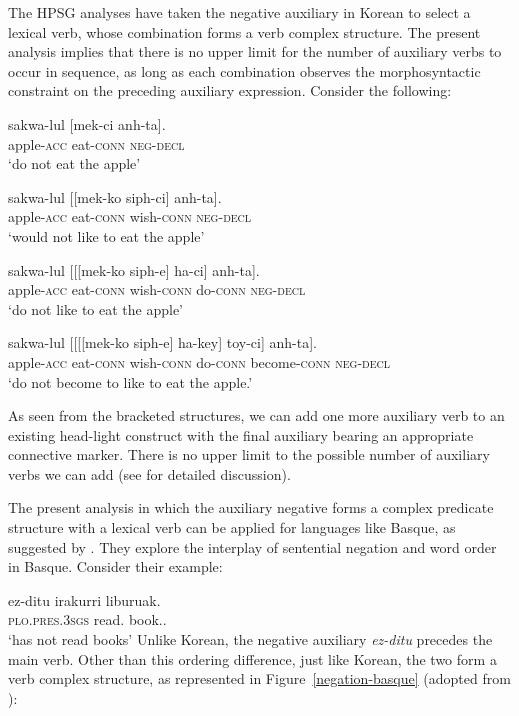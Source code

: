 \documentclass[output=paper
                ,modfonts
                ,nonflat
	        ,collection
	        ,collectionchapter
	        ,collectiontoclongg
 	        ,biblatex
                ,babelshorthands
                ,newtxmath
                ,draftmode
                ,colorlinks, citecolor=brown
]{./langsci/langscibook}
\begin{document}
{\begin{exe}
\begin{xlist}
\begin{exe}
\begin{xlist}
The HPSG analyses have taken the negative auxiliary in Korean
to select a lexical verb, whose combination forms a verb complex
structure. The present analysis implies that there is no upper limit for the
number of auxiliary verbs to
occur in sequence, as long as each combination observes
the morphosyntactic constraint on the preceding auxiliary expression. Consider
the following:

\eal\ex \gll sakwa-lul [mek-ci anh-ta]. \\
apple-\textsc{acc} eat-\textsc{conn} \textsc{neg}-\textsc{decl} \\
\glt`do not eat the apple'

\ex \gll sakwa-lul [[mek-ko siph-ci] anh-ta]. \\
apple-\textsc{acc} eat-\textsc{conn} wish-\textsc{conn} \textsc{neg}-\textsc{decl} \\
\glt`would not like to eat the apple'

\ex \label{negation-20c} \gll sakwa-lul [[[mek-ko siph-e] ha-ci] anh-ta]. \\
apple-\textsc{acc} eat-\textsc{conn} wish-\textsc{conn} do-\textsc{conn} \textsc{neg}-\textsc{decl} \\
\glt`do not like to eat the apple'

\ex \gll sakwa-lul [[[[mek-ko siph-e] ha-key] toy-ci] anh-ta]. \\
apple-\textsc{acc} eat-\textsc{conn} wish-\textsc{conn} do-\textsc{conn} become-\textsc{conn} \textsc{neg}-\textsc{decl} \\
\glt`do not become to like to eat the apple.'
\end{xlist} \end{exe}
%
As seen from the bracketed structures, we can add one more auxiliary verb to
an existing head-light construct with the final auxiliary bearing an appropriate
  connective marker. There is no upper limit to the possible number  of auxiliary
  verbs we can add (see \citealt[]{Kim:16} for detailed discussion).

The present analysis in which the auxiliary negative forms a complex
predicate structure with a lexical verb can be applied for languages
like Basque, as suggested by \citet{CB:11}. They explore the interplay of sentential
negation and word order in Basque. Consider their example:

\ea
\label{negation-basque-ex}
\gll ez-ditu irakurri liburuak. \\
     \textsc{plo}.\textsc{pres}.\textsc{3sgs} read.\PRF{} book.\ABS.\pl\\
\glt `has not read books'
\z
%
%
Unlike Korean, the negative auxiliary \textit{ez-ditu} precedes
the main verb. Other than this ordering difference, just
like Korean, the two form a verb complex structure, as represented in
Figure~\ref{negation-basque} (adopted from \citealt{CB:11}):


\end{xlist}
\end{exe}}
\end{document}
